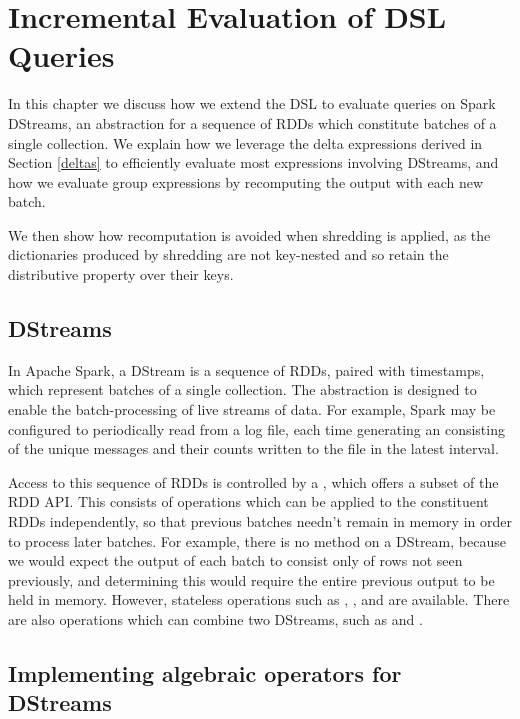 \chapter{Incremental Evaluation of DSL Queries} \label{incrementalisation}

In this chapter we discuss how we extend the DSL to evaluate queries on Spark DStreams, an abstraction for a sequence of RDDs which constitute batches of a single collection. We explain how we leverage the delta expressions derived in Section \ref{deltas} to efficiently evaluate most expressions involving DStreams, and how we evaluate group expressions by recomputing the output with each new batch.

We then show how recomputation is avoided when shredding is applied, as the dictionaries produced by shredding are not key-nested and so retain the distributive property over their keys.

\section{DStreams}

In Apache Spark, a DStream \cite{dstream} is a sequence of RDDs, paired with timestamps, which represent batches of a single collection. The abstraction is designed to enable the batch-processing of live streams of data. For example, Spark may be configured to periodically read from a log file, each time generating an  consisting of the unique messages and their counts written to the file in the latest interval.

Access to this sequence of RDDs is controlled by a , which offers a subset of the RDD API. This consists of operations which can be applied to the constituent RDDs independently, so that previous batches needn't remain in memory in order to process later batches. For example, there is no method  on a DStream, because we would expect the output of each batch to consist only of rows not seen previously, and determining this would require the entire previous output to be held in memory. However, stateless operations such as , , and  are available. There are also operations which can combine two DStreams, such as  and .


\section{Implementing algebraic operators for DStreams}

